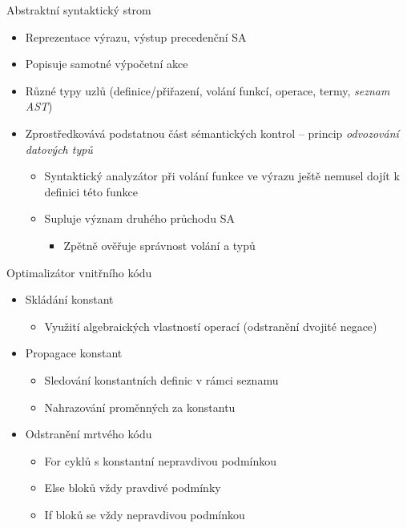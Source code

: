 \documentclass[10pt,xcolor=pdflatex,hyperref={unicode,hidelinks}]{beamer}
\begin{document}
\begin{frame}{Abstraktní syntaktický strom}
    \begin{itemize}
        \item Reprezentace výrazu, výstup precedenční SA
        \item Popisuje samotné výpočetní akce
        \item Různé typy uzlů (definice/přiřazení, volání funkcí, operace, termy, \textit{seznam AST})
        \item Zprostředkovává podstatnou část sémantických kontrol -- princip \emph{odvozování datových typů}
        \begin{itemize}
            \item Syntaktický analyzátor při volání funkce ve výrazu ještě nemusel dojít k definici této funkce
            \item Supluje význam druhého průchodu SA
            \begin{itemize}
                \item Zpětně ověřuje správnost volání a typů
            \end{itemize}
        \end{itemize}
    \end{itemize}
\end{frame}

\begin{frame}{Optimalizátor vnitřního kódu}
    \begin{itemize}
        \item Skládání konstant
        \begin{itemize}
            \item Využití algebraických vlastností operací (odstranění dvojité negace)
        \end{itemize}
        \item Propagace konstant
            \begin{itemize}
                \item Sledování konstantních definic v rámci seznamu
                \item Nahrazování proměnných za konstantu
            \end{itemize}
        \item Odstranění mrtvého kódu
        \begin{itemize}
            \item For cyklů s konstantní nepravdivou podmínkou
            \item Else bloků vždy pravdivé podmínky
            \item If bloků se vždy nepravdivou podmínkou
        \end{itemize}
    \end{itemize}
\end{frame}
\end{document}
